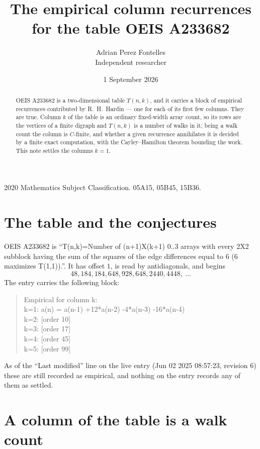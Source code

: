 \documentclass[11pt,a4paper]{article}
\title{The empirical column recurrences for the table OEIS A233682}
\author{Adrian Perez Fontelles\\ \small Independent researcher}
\date{1 September 2026}
\theoremstyle{plain}
\theoremstyle{definition}
\begin{document}
\maketitle

\begin{abstract}
OEIS A233682 is a two-dimensional table $T(n,k)$, and it carries a block of empirical
recurrences contributed by R.~H.~Hardin --- one for each of its first few columns. They are
true. Column $k$ of the table is an ordinary fixed-width array count, so its rows are the
vertices of a finite digraph and $T(n,k)$ is a number of walks in it; being a walk count the
column is $C$-finite, and whether a given recurrence annihilates it is decided by a finite
exact computation, with the Cayley--Hamilton theorem bounding the work. This note settles the columns $k=1$.
\end{abstract}

\noindent\small 2020 Mathematics Subject Classification. 05A15, 05B45, 15B36.\normalsize

\section{The table and the conjectures}

OEIS A233682 is ``T(n,k)=Number of (n+1)X(k+1) 0..3 arrays with every 2X2 subblock having the sum of the squares of the edge differences equal to 6 (6 maximizes T(1,1)).''. It has offset $1$, is
read by antidiagonals, and begins
\[
48, 184, 184, 648, 928, 648, 2440, 4448,\ \dots
\]
The entry carries the following block:
\begin{quote}\small
Empirical for column k:\\
k=1: a(n) = a(n-1) +12*a(n-2) -4*a(n-3) -16*a(n-4)\\
k=2: [order 10]\\
k=3: [order 17]\\
k=4: [order 45]\\
k=5: [order 99]\\
\end{quote}
As of the ``Last modified'' line on the live entry (Jun 02 2025 08:57:23, revision 6) these are still
recorded as empirical, and nothing on the entry records any of them as settled.

\section{A column of the table is a walk count}
\end{document}
